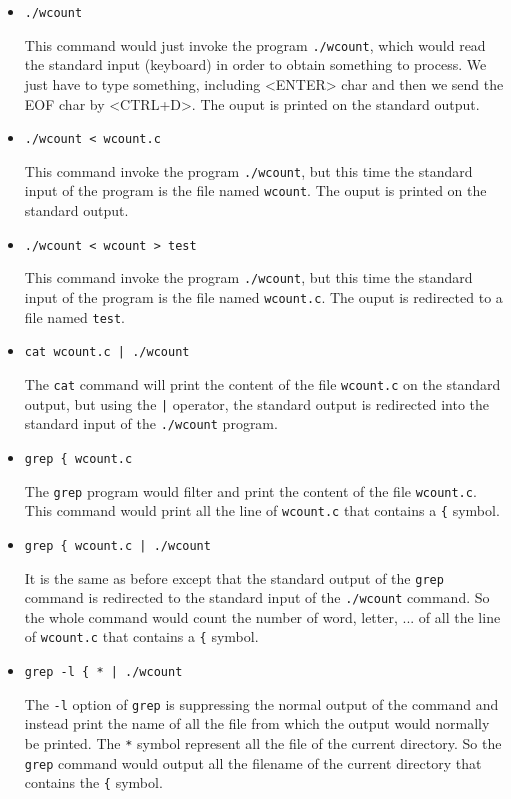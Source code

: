 \documentclass[a4paper,11pt]{report}
\begin{document}
\begin{itemize}
\item \verb+./wcount+
  
  This command would just invoke the program \verb+./wcount+, which would read
  the standard input (keyboard) in order to obtain something to process. We just
  have to type something, including <ENTER> char and then we send the EOF char
  by <CTRL+D>. The ouput is printed on the standard output.
  
\item \verb+./wcount < wcount.c+

  This command invoke the program \verb+./wcount+, but this time the standard
  input of the program is the file named \verb+wcount+. The ouput is printed
  on the standard output.
  
\item \verb+./wcount < wcount > test+

  This command invoke the program \verb+./wcount+, but this time the standard
  input of the program is the file named \verb+wcount.c+. The ouput is
  redirected to a file named \verb+test+.
  
\item \verb+cat wcount.c | ./wcount+

  The \verb+cat+ command will print the content of the file \verb+wcount.c+ on
  the standard output, but using the \verb+|+ operator, the standard output is
  redirected into the standard input of the \verb+./wcount+ program.
  
\item \verb+grep { wcount.c+

    The \verb+grep+ program would filter and print the content of the file
    \verb+wcount.c+. This command would print all the line of \verb+wcount.c+
    that contains a \verb+{+ symbol.
    
\item \verb+grep { wcount.c | ./wcount+

    It is the same as before except that the standard output of the \verb+grep+
    command is redirected to the standard input of the \verb+./wcount+ command.
    So the whole command would count the number of word, letter, ... of all the
    line of \verb+wcount.c+ that contains a \verb+{+ symbol.
    
\item \verb+grep -l { * | ./wcount+

    The \verb+-l+ option of \verb+grep+ is suppressing the normal output of the
    command and instead print the name of all the file from which the output
    would normally be printed. The \verb+*+ symbol represent all the file of the
    current directory. So the \verb+grep+ command would output all the filename
    of the current directory that contains the \verb+{+ symbol.
    
\end{itemize}
\end{document}
